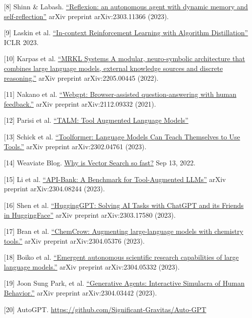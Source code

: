 {[}8{]} Shinn \& Labash. \href{https://arxiv.org/abs/2303.11366}{``Reflexion: an autonomous agent with dynamic memory and self-reflection''} arXiv preprint arXiv:2303.11366 (2023).

{[}9{]} Laskin et al. \href{https://arxiv.org/abs/2210.14215}{``In-context Reinforcement Learning with Algorithm Distillation''} ICLR 2023.

{[}10{]} Karpas et al. \href{https://arxiv.org/abs/2205.00445}{``MRKL Systems A modular, neuro-symbolic architecture that combines large language models, external knowledge sources and discrete reasoning.''} arXiv preprint arXiv:2205.00445 (2022).

{[}11{]} Nakano et al. \href{https://arxiv.org/abs/2112.09332}{``Webgpt: Browser-assisted question-answering with human feedback.''} arXiv preprint arXiv:2112.09332 (2021).

{[}12{]} Parisi et al. \href{https://arxiv.org/abs/2205.12255}{``TALM: Tool Augmented Language Models''}

{[}13{]} Schick et al. \href{https://arxiv.org/abs/2302.04761}{``Toolformer: Language Models Can Teach Themselves to Use Tools.''} arXiv preprint arXiv:2302.04761 (2023).

{[}14{]} Weaviate Blog. \href{https://weaviate.io/blog/why-is-vector-search-so-fast}{Why is Vector Search so fast?} Sep 13, 2022.

{[}15{]} Li et al. \href{https://arxiv.org/abs/2304.08244}{``API-Bank: A Benchmark for Tool-Augmented LLMs''} arXiv preprint arXiv:2304.08244 (2023).

{[}16{]} Shen et al. \href{https://arxiv.org/abs/2303.17580}{``HuggingGPT: Solving AI Tasks with ChatGPT and its Friends in HuggingFace''} arXiv preprint arXiv:2303.17580 (2023).

{[}17{]} Bran et al. \href{https://arxiv.org/abs/2304.05376}{``ChemCrow: Augmenting large-language models with chemistry tools.''} arXiv preprint arXiv:2304.05376 (2023).

{[}18{]} Boiko et al. \href{https://arxiv.org/abs/2304.05332}{``Emergent autonomous scientific research capabilities of large language models.''} arXiv preprint arXiv:2304.05332 (2023).

{[}19{]} Joon Sung Park, et al. \href{https://arxiv.org/abs/2304.03442}{``Generative Agents: Interactive Simulacra of Human Behavior.''} arXiv preprint arXiv:2304.03442 (2023).

{[}20{]} AutoGPT. \url{https://github.com/Significant-Gravitas/Auto-GPT}

